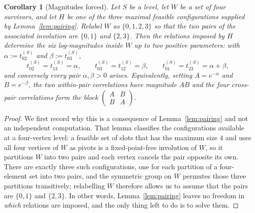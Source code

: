 \documentclass[11pt]{article}
\theoremstyle{plain}
\newtheorem{corollary}[theorem]{Corollary}
\theoremstyle{definition}
\begin{document}
\begin{aiblock}
\begin{corollary}[Magnitudes forced]\label{cor:magnitudes}
Let $S$ be a level, let $W$ be a set of four survivors, and let $H$ be one of the three maximal
feasible configurations supplied by Lemma~\ref{lem:pairing}. Relabel $W$ as $\{0,1,2,3\}$ so that the
two pairs of the associated involution are $\{0,1\}$ and $\{2,3\}$. Then the relations imposed by $H$
determine the six log-magnitudes inside $W$ up to two positive parameters: with
$\alpha:=t^{(S)}_{02}$ and $\beta:=t^{(S)}_{03}$,
\[
  t^{(S)}_{02}=t^{(S)}_{13}=\alpha,\qquad
  t^{(S)}_{03}=t^{(S)}_{12}=\beta,\qquad
  t^{(S)}_{01}=t^{(S)}_{23}=\alpha+\beta,
\]
and conversely every pair $\alpha,\beta>0$ arises. Equivalently, setting $A=e^{-\alpha}$ and
$B=e^{-\beta}$, the two within-pair correlations have magnitude $AB$ and the four cross-pair
correlations form the block $\begin{pmatrix}A&B\\B&A\end{pmatrix}$.
\end{corollary}

\begin{proof}
We first record why this is a consequence of Lemma~\ref{lem:pairing} and not an independent
computation. That lemma classifies the configurations available at a four-vertex level: a feasible set
of slots that has the maximum size $4$ and uses all four vertices of $W$ as pivots is a fixed-point-free
involution of $W$, so it partitions $W$ into two pairs and each vertex cancels the pair opposite its
own. There are exactly three such configurations, one for each partition of a four-element set into two
pairs, and the symmetric group on $W$ permutes those three partitions transitively; relabelling $W$
therefore allows us to assume that the pairs are $\{0,1\}$ and $\{2,3\}$. In other words, Lemma~\ref{lem:pairing}
leaves no freedom in \emph{which} relations are imposed, and the only thing left to do is to solve them.


\end{proof}
\end{aiblock}
\end{document}
